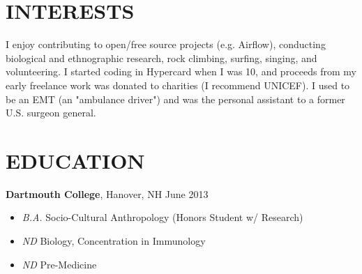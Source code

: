 \documentclass[a4paper, 10pt]{article}
\begin{document}
\section*{INTERESTS}
\vspace{-3mm}
I enjoy contributing to open/free source projects (e.g. Airflow), conducting biological and ethnographic research, rock climbing, surfing, singing, and volunteering.  I started coding in Hypercard when I was 10, and proceeds from my early freelance work was donated to charities (I recommend UNICEF).  I used to be an EMT (an "ambulance driver") and was the personal assistant to a former U.S. surgeon general.

\section*{EDUCATION}
\vspace{-3mm}
{\bf Dartmouth College}, Hanover, NH \hfill June 2013 \\[-7mm]
\begin{itemize}[leftmargin=5mm] 
\itemsep -1mm
	\item[] {\sl B.A.} {Socio-Cultural Anthropology (Honors Student w/ Research)}
	\item[] {\sl ND} {Biology, Concentration in Immunology}
	\item[] {\sl ND} {Pre-Medicine}
\end{itemize}
                
\end{document}
